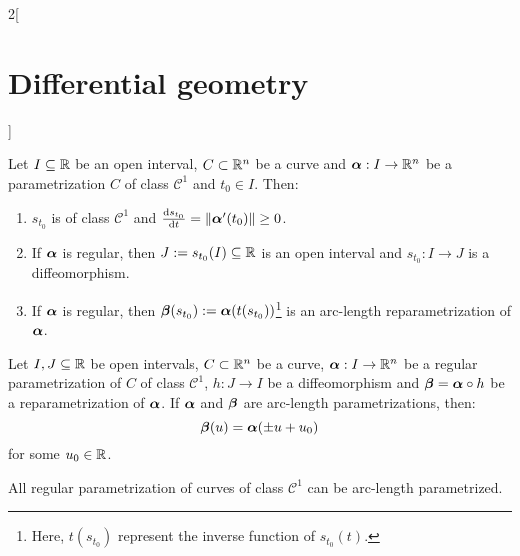 \documentclass[../../../main.tex]{subfiles}
\begin{document}
\begin{multicols}{2}[\section{Differential geometry}]
\begin{definition}
  \end{definition}
  \begin{proposition}
    Let $I\subseteq\mathbb{R}$ be an open interval, $C\subset\mathbb{R}^n$ be a curve and $\boldsymbol{\mathrm{\alpha}}:I\rightarrow\mathbb{R}^n$ be a parametrization $C$ of class $\mathcal{C}^1$ and ${t_0}\in I$. Then:
    \begin{enumerate}
      \item $s_{t_0}$ is of class $\mathcal{C}^1$ and $\dv{s_{t_0}}{t}(t_0)=\|\boldsymbol{\mathrm{\alpha}}'(t_0)\|\geq 0$.
      \item If $\boldsymbol{\mathrm{\alpha}}$ is regular, then $J:=s_{t_0}(I)\subseteq\mathbb{R}$ is an open interval and $s_{t_0}:I\rightarrow J$ is a diffeomorphism.
      \item If $\boldsymbol{\mathrm{\alpha}}$ is regular, then $\boldsymbol{\mathrm{\beta}}(s_{t_0}):=\boldsymbol{\mathrm{\alpha}}(t(s_{t_0}))$\footnote{Here, $t(s_{t_0})$ represent the inverse function of $s_{t_0}(t)$.} is an arc-length reparametrization of $\boldsymbol{\mathrm{\alpha}}$.
    \end{enumerate}
  \end{proposition}
  \begin{proposition}
    Let $I,J\subseteq\mathbb{R}$ be open intervals, $C\subset\mathbb{R}^n$ be a curve, $\boldsymbol{\mathrm{\alpha}}:I\rightarrow\mathbb{R}^n$ be a regular parametrization of $C$ of class $\mathcal{C}^1$, $h:J\rightarrow I$ be a diffeomorphism and $\boldsymbol{\mathrm{\beta}}=\boldsymbol{\mathrm{\alpha}}\circ h$ be a reparametrization of $\boldsymbol{\mathrm{\alpha}}$. If $\boldsymbol{\mathrm{\alpha}}$ and $\boldsymbol{\mathrm{\beta}}$ are arc-length parametrizations, then: $$\boldsymbol{\mathrm{\beta}}(u)=\boldsymbol{\mathrm{\alpha}}(\pm u+u_0)$$ for some $u_0\in\mathbb{R}$.
  \end{proposition}
  \begin{proposition}
    All regular parametrization of curves of class $\mathcal{C}^1$ can be arc-length parametrized.
  \end{proposition}

\end{multicols}
\end{document}
